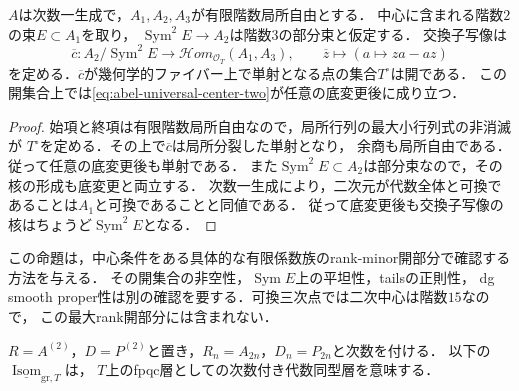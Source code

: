 \begin{proposition}[二次中心の普遍性を保証する有限rank条件]
\label{prop:abel-center-rank-open}
$A$は次数一生成で，$A_1,A_2,A_3$が有限階数局所自由とする．
中心に含まれる階数$2$の束$E\subset A_1$を取り，
$\operatorname{Sym}^2E\to A_2$は階数$3$の部分束と仮定する．
交換子写像は
\begin{equation}\label{eq:abel-center-commutator-map}
 \overline c:A_2/\operatorname{Sym}^2E
     \longrightarrow\mathcal Hom_{\mathcal O_T}(A_1,A_3),
 \qquad \overline z\longmapsto(a\longmapsto za-az)
\end{equation}
を定める．$\overline c$が幾何学的ファイバー上で単射となる点の集合$T^\circ$は開である．
この開集合上では\eqref{eq:abel-universal-center-two}が任意の底変更後に成り立つ．
\end{proposition}
\begin{proof}
始項と終項は有限階数局所自由なので，局所行列の最大小行列式の非消滅が
$T^\circ$を定める．その上で$\overline c$は局所分裂した単射となり，
余商も局所自由である．従って任意の底変更後も単射である．
また$\operatorname{Sym}^2E\subset A_2$は部分束なので，その核の形成も底変更と両立する．
次数一生成により，二次元が代数全体と可換であることは$A_1$と可換であることと同値である．
従って底変更後も交換子写像の核はちょうど$\operatorname{Sym}^2E$となる．
\end{proof}

この命題は，中心条件をある具体的な有限係数族のrank-minor開部分で確認する方法を与える．
その開集合の非空性，$\operatorname{Sym}E$上の平坦性，tailsの正則性，
dg smooth proper性は別の確認を要する．可換三次点では二次中心は階数$15$なので，
この最大rank開部分には含まれない．

$R=A^{(2)}$，$D=P^{(2)}$と置き，$R_n=A_{2n}$，$D_n=P_{2n}$と次数を付ける．
以下の$\underline{\operatorname{Isom}}_{\mathrm{gr},T}$は，
$T$上のfpqc層としての次数付き代数同型層を意味する．

